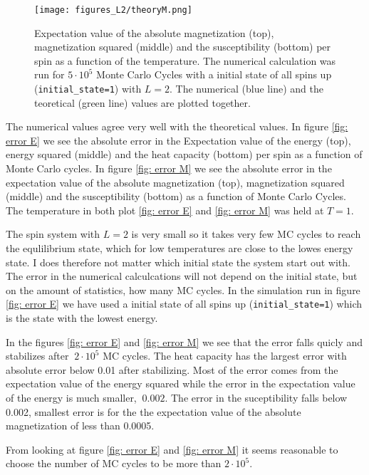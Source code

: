 \documentclass[11pt,a4wide]{article}
\begin{document}
\begin{figure}[htp]
\centering
\texttt{[image: figures\_L2/theoryM.png]}
\caption{ Expectation value of the absolute magnetization (top), magnetization squared (middle) and the susceptibility (bottom) per spin as a function of the temperature. The numerical calculation was run for $5\cdot10^5$ Monte Carlo Cycles with a initial state of all spins up (\texttt{initial\_state=1}) with $L=2$. The numerical (blue line) and the teoretical (green line) values are plotted together.}
\label{fig:theory M}
\end{figure}

The numerical values agree very well with the theoretical values. In figure \ref{fig: error E} we see the absolute error in the Expectation value of the energy (top), energy squared (middle) and the heat capacity (bottom) per spin as a function of Monte Carlo cycles. In figure \ref{fig: error M} we see the absolute error in the expectation value of the absolute magnetization (top), magnetization squared (middle) and the susceptibility (bottom) as a function of Monte Carlo Cycles. The temperature in both plot \ref{fig: error E} and \ref{fig: error M} was held at $T=1$.

The spin system with $L=2$ is very small so it takes very few MC cycles to reach the equlilibrium state, which for low temperatures are close to the lowes energy state. I does therefore not matter which initial state the system start out with. The error in the numerical calculcations will not depend on the initial state, but on the amount of statistics, how many MC cycles. In the simulation run in figure \ref{fig: error E} we have used a initial state of all spins up (\texttt{initial\_state=1}) which is the state with the lowest energy.  

In the figures \ref{fig: error E} and \ref{fig: error M} we see that the error falls quicly and stabilizes after $~2\cdot 10^5$ MC cycles. The heat capacity has the largest error with absolute error below 0.01 after stabilizing. Most of the error comes from the expectation value of the energy squared while the error in the expectation value of the energy is much smaller, $~0.002$. The error in the suceptibility falls below 0.002, smallest error is for the the expectation value of the absolute magnetization of less than 0.0005.

From looking at figure \ref{fig: error E} and \ref{fig: error M} it seems reasonable to choose the number of MC cycles to be more than $2\cdot10^5$.
\end{document}

